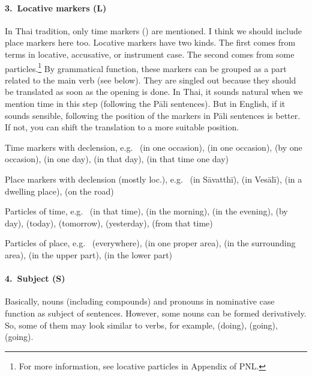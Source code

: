 \paragraph*{3.\ Locative markers (\textbf{L})} In Thai tradition, only time markers () are mentioned. I think we should include place markers here too. Locative markers have two kinds. The first comes from terms in locative, accusative, or instrument case. The second comes from some particles.\footnote{For more information, see locative particles in Appendix  of PNL.} By grammatical function, these markers can be grouped as a part related to the main verb (see below). They are singled out because they should be translated as soon as the opening is done. In Thai, it sounds natural when we mention time in this step (following the P\=ali sentences). But in English, if it sounds sensible, following the position of the markers in P\=ali sentences is better. If not, you can shift the translation to a more suitable position.\par
\begin{compactenum}[(1)]
\item Time markers with declension, e.g.\  (in one occasion),  (in one occasion),  (by one occasion),  (in one day),  (in that day),  (in that time one day)\par
\item Place markers with declension (mostly loc.), e.g.\  (in S\=avatth\=i),  (in Ves\=al\=i),  (in a dwelling place),  (on the road)\par
\item Particles of time, e.g.\  (in that time),  (in the morning),  (in the evening),  (by day),  (today),  (tomorrow),  (yesterday),  (from that time)\par
\item Particles of place, e.g.\  (everywhere),  (in one proper area),  (in the surrounding area),  (in the upper part),  (in the lower part)\par
\end{compactenum}

\paragraph*{4.\ Subject (\textbf{S})} Basically, nouns (including compounds) and pronouns in nominative case function as subject of sentences. However, some nouns can be formed derivatively. So, some of them may look similar to verbs, for example,  (doing),  (going),  (going). 

